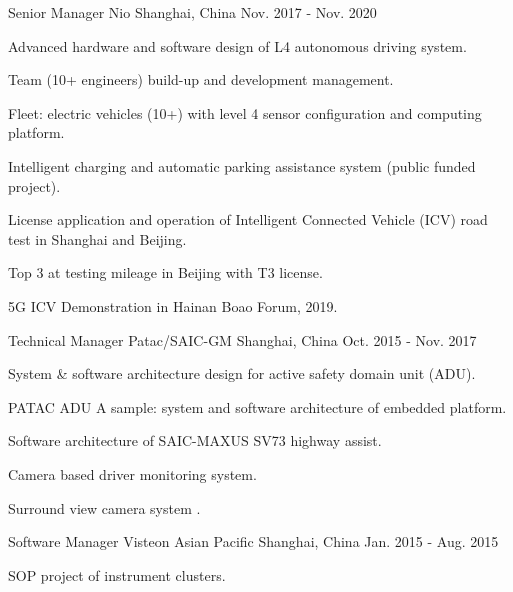 \documentclass[../cv_xin.tex]{subfiles}
\begin{document}
\begin{cventries}
  \cventry
    {Senior Manager} %
    {Nio} %
    {Shanghai, China} %
    {Nov. 2017 - Nov. 2020} %
    {
      \begin{cvitems}
        \item Advanced hardware and software design of L4 autonomous driving system.
        \item Team (10+ engineers) build-up and development management.
        \item Fleet: electric vehicles (10+) with level 4 sensor configuration and computing platform.
        \item Intelligent charging and automatic parking assistance system (public funded project).
        \item License application and operation of Intelligent Connected Vehicle (ICV) road test in Shanghai and Beijing.
        \item Top 3 at testing mileage in Beijing with T3 license.
        \item 5G ICV Demonstration in Hainan Boao Forum, 2019.
      \end{cvitems}
    }

  \cventry
    {Technical Manager} %
    {Patac/SAIC-GM} %
    {Shanghai, China} %
    {Oct. 2015 - Nov. 2017} %
    {
      \begin{cvitems}
        \item System \& software architecture design for active safety domain unit (ADU).
        \item PATAC ADU A sample: system and software architecture of embedded platform.
        \item Software architecture of SAIC-MAXUS SV73 highway assist.
        \item Camera based driver monitoring system.
        \item Surround view camera system \supercite{Xin_RearView_17}.
      \end{cvitems}
    }


  \cventry
    {Software Manager} %
    {Visteon Asian Pacific} %
    {Shanghai, China} %
    {Jan. 2015 - Aug. 2015} %
    {
      \begin{cvitems}
        \item SOP project of instrument clusters.
      \end{cvitems}
    }


\end{cventries}
\end{document}
